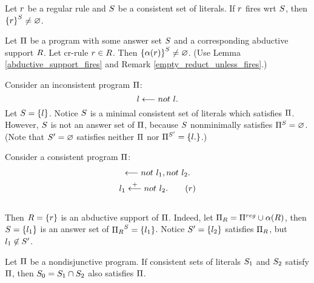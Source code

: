 \documentclass{paper}
\begin{document}
\begin{flushleft}
\begin{remark}
\label{empty_reduct_unless_fires}

Let $r$ be a regular rule and $S$ be a consistent set
of literals.
If $r$ fires wrt $S$, then
${\{r\}}^{S} \ne \varnothing$.

\end{remark}

\begin{remark}
\label{nonempty_reduced_cr_rule}

Let $\Pi$ be a \cp{} program with some answer set $S$
and a corresponding abductive support $R$.
Let cr-rule $r \in R$. Then
${\{\alpha(r)\}}^{S} \ne \varnothing$.
(Use Lemma \ref{abductive_support_fires} and Remark
\ref{empty_reduct_unless_fires}.)

\end{remark}

\begin{example}

Consider an inconsistent \ap{} program $\Pi$:
$$l \longleftarrow not\ {l}.$$
Let $S = \{l\}$.
Notice $S$ is a minimal consistent set of literals
which satisfies $\Pi$.
However, $S$ is not an answer set of $\Pi$, because
$S$ nonminimally satisfies ${\Pi}^{S} = \varnothing$.
(Note that ${S}' = \varnothing$ satisfies neither $\Pi$ nor
${\Pi}^{{S}'} = \{l.\}$.)

\end{example}

\begin{example}

Consider a consistent \cp{} program $\Pi$:
\begin{gather*}
\when \negd {\n\lit1}, \negd {\n\lit2}. \\
\n\lit1 \whencr \negd {\n\lit2}. \tag{$\rl$}
\end{gather*} \\
Then $R = \{r\}$ is an abductive support of $\Pi$.
Indeed, let $\Pi_{R} = \Pi^{reg} \cup \alpha(R)$,
then $S = \{{l}_{1}\}$ is an answer set of
${\Pi_{R}}^{S} = \{{l}_{1}\}$.
Notice ${S}' = \{{l}_{2}\}$ satisfies $\Pi_{R}$,
but ${l}_{1} \not\in {S}'$.

\end{example}

\begin{lemma}
\label{intersection_satisfies}

Let $\Pi$ be a nondisjunctive \dnf{} \ap{} program.
If consistent sets of literals ${S}_{1}$ and ${S}_{2}$
satisfy $\Pi$,
then ${S}_{0} = {S}_{1} \cap {S}_{2}$ also satisfies
$\Pi$.


\end{lemma}
\end{flushleft}
\end{document}
